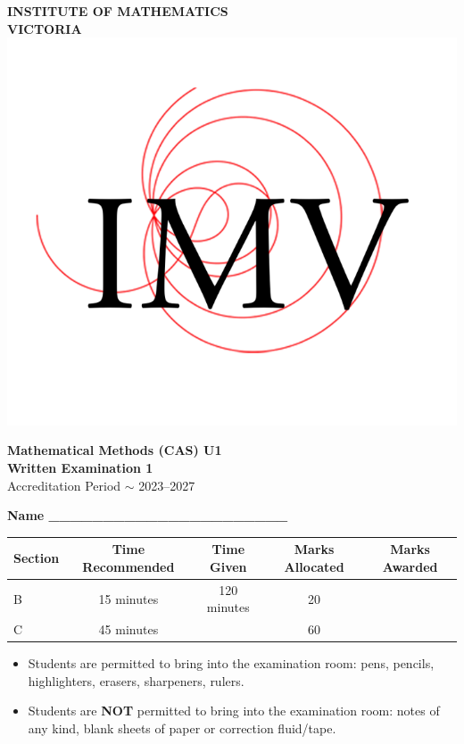 \documentclass[a4paper,12pt]{article}
\begin{document}
\begin{center}
    \vspace{0.2cm}
    
    \Huge \textbf{INSTITUTE OF MATHEMATICS \\ VICTORIA} \\
    \vspace{0.2cm}
    \includegraphics[width=0.2\linewidth]{IMV yt.png}
    \vspace{0.2cm}
    
    \LARGE \textbf{Mathematical Methods (CAS) U1} \\
    \vspace{0.2cm}
    \LARGE \textbf{Written Examination 1} \\
    \vspace{0.2cm}
    \Large Accreditation Period $\sim$ 2023--2027 \\
    \vspace{1cm}
    
    \normalsize \textbf{Name \_\_\_\_\_\_\_\_\_\_\_\_\_\_\_\_\_\_\_\_\_\_} \\
    \vspace{1cm}
    
    \begin{tabular}{|l|c|c|c|c|}
        \hline
        \textbf{Section} & \textbf{Time Recommended} & \textbf{Time Given} & \textbf{Marks Allocated} & \textbf{Marks Awarded} \\
        \hline
        B & 15 minutes & 120 minutes & 20 & \\
        \hline
        C & 45 minutes & & 60 & \\
        \hline
    \end{tabular}
    
    \vspace{1cm}
    
    \begin{minipage}{0.9\textwidth}
    \begin{itemize}
        \item Students are permitted to bring into the examination room: pens, pencils, highlighters, erasers, sharpeners, rulers.
        \item Students are \textbf{NOT} permitted to bring into the examination room: notes of any kind, blank sheets of paper or correction fluid/tape.
    \end{itemize}
    \end{minipage}
    

\end{center}
\end{document}
